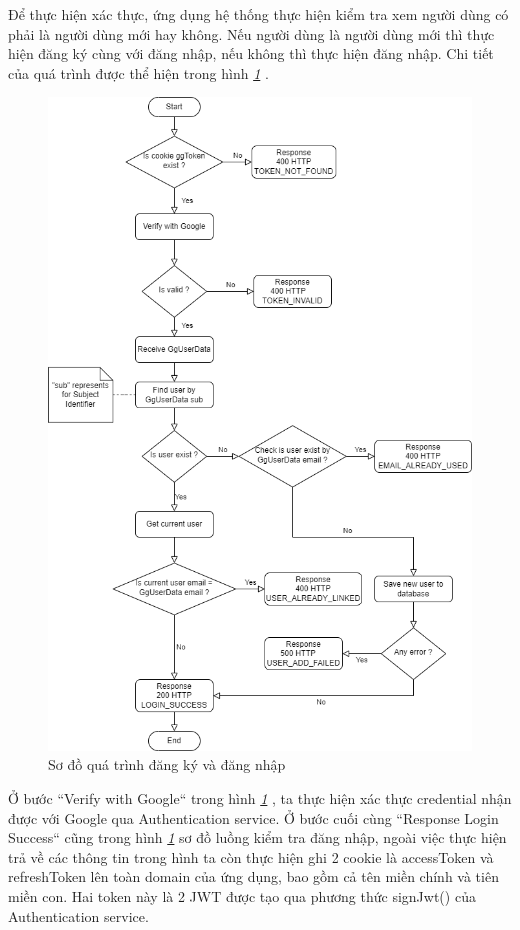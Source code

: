 Để thực hiện xác thực, ứng dụng hệ thống thực hiện kiểm tra xem người dùng có phải là người dùng mới hay không.
Nếu người dùng là người dùng mới thì thực hiện đăng ký cùng với đăng nhập, nếu không thì thực hiện đăng nhập.
Chi tiết của quá trình được thể hiện trong hình \textit{\ref{fig:SignUpIn} }.

\begin{figure}[H]
  \centering
  \includegraphics[width=\textwidth]{applied-thesis-chapters/chapter-4/Sơ đồ quá trình đăng ký và đăng nhập.png}
  \caption{Sơ đồ quá trình đăng ký và đăng nhập}
  \label{fig:SignUpIn}
\end{figure}

Ở bước “Verify with Google“ trong hình \textit{\ref{fig:SignUpIn} }, ta thực hiện xác thực credential nhận được với Google qua Authentication service.
Ở bước cuối cùng “Response Login Success“ cũng trong hình \textit{\ref{fig:SignUpIn} } sơ đồ luồng kiểm tra đăng nhập, ngoài việc thực hiện trả về các thông tin trong hình ta còn thực hiện ghi 2 cookie là accessToken và refreshToken lên toàn domain của ứng dụng, bao gồm cả tên miền chính và tiên miền con. Hai token này là 2 JWT được tạo qua phương thức signJwt() của Authentication service.

